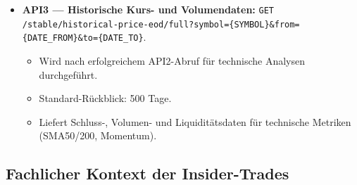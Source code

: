 \begin{itemize}
  \item \textbf{API3 --- Historische Kurs- und Volumendaten:} \texttt{GET /stable/historical-price-eod/full?symbol=\{SYMBOL\}\&from=\{DATE\_FROM\}\&to=\{DATE\_TO\}}. %
    \begin{itemize}
      \item Wird nach erfolgreichem API2-Abruf für technische Analysen durchgeführt.
      \item Standard-Rückblick: 500 Tage. %
      \item Liefert Schluss-, Volumen- und Liquiditätsdaten für technische Metriken (SMA50/200, Momentum).
    \end{itemize}
\end{itemize}

\subsection{Fachlicher Kontext der Insider-Trades}
